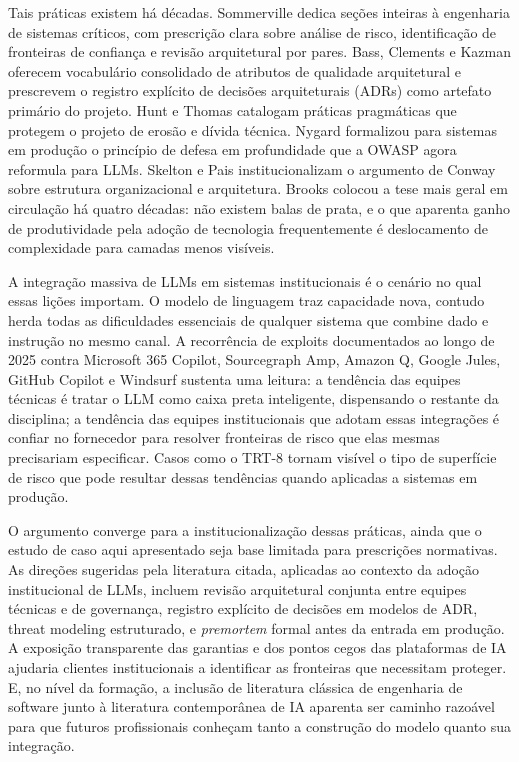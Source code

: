\documentclass[11pt,a4paper]{article}
\begin{document}
Tais práticas existem há décadas. Sommerville \cite{sommerville2016} dedica seções inteiras à engenharia de sistemas críticos, com prescrição clara sobre análise de risco, identificação de fronteiras de confiança e revisão arquitetural por pares. Bass, Clements e Kazman \cite{bass2012} oferecem vocabulário consolidado de atributos de qualidade arquitetural e prescrevem o registro explícito de decisões arquiteturais (ADRs) como artefato primário do projeto. Hunt e Thomas \cite{hunt1999} catalogam práticas pragmáticas que protegem o projeto de erosão e dívida técnica. Nygard \cite{nygard2018} formalizou para sistemas em produção o princípio de defesa em profundidade que a OWASP \cite{owasp2025} agora reformula para LLMs. Skelton e Pais \cite{skelton2019} institucionalizam o argumento de Conway sobre estrutura organizacional e arquitetura. Brooks \cite{brooks1995} colocou a tese mais geral em circulação há quatro décadas: não existem balas de prata, e o que aparenta ganho de produtividade pela adoção de tecnologia frequentemente é deslocamento de complexidade para camadas menos visíveis.

A integração massiva de LLMs em sistemas institucionais é o cenário no qual essas lições importam. O modelo de linguagem traz capacidade nova, contudo herda todas as dificuldades essenciais de qualquer sistema que combine dado e instrução no mesmo canal. A recorrência de exploits documentados ao longo de 2025 contra Microsoft 365 Copilot, Sourcegraph Amp, Amazon Q, Google Jules, GitHub Copilot e Windsurf sustenta uma leitura: a tendência das equipes técnicas é tratar o LLM como caixa preta inteligente, dispensando o restante da disciplina; a tendência das equipes institucionais que adotam essas integrações é confiar no fornecedor para resolver fronteiras de risco que elas mesmas precisariam especificar. Casos como o TRT-8 tornam visível o tipo de superfície de risco que pode resultar dessas tendências quando aplicadas a sistemas em produção.

O argumento converge para a institucionalização dessas práticas, ainda que o estudo de caso aqui apresentado seja base limitada para prescrições normativas. As direções sugeridas pela literatura citada, aplicadas ao contexto da adoção institucional de LLMs, incluem revisão arquitetural conjunta entre equipes técnicas e de governança, registro explícito de decisões em modelos de ADR, threat modeling estruturado, e \emph{premortem} formal antes da entrada em produção. A exposição transparente das garantias e dos pontos cegos das plataformas de IA ajudaria clientes institucionais a identificar as fronteiras que necessitam proteger. E, no nível da formação, a inclusão de literatura clássica de engenharia de software junto à literatura contemporânea de IA aparenta ser caminho razoável para que futuros profissionais conheçam tanto a construção do modelo quanto sua integração.
\end{document}
